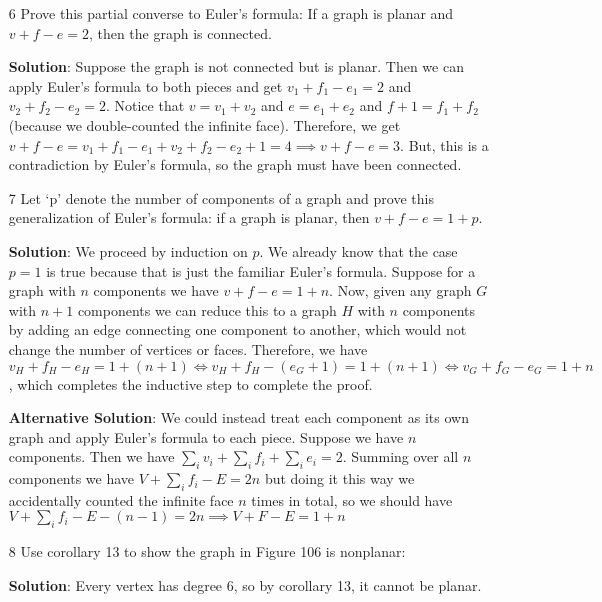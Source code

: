 \documentclass{article}
\begin{document}
\begin{enumerate}
	\item[6] Prove this partial converse to Euler's formula: If a graph is planar and $v + f - e = 2$, then the graph is connected.
	
	\textbf{Solution}: Suppose the graph is not connected but is planar. Then we can apply Euler's formula to both pieces and get $v_1 + f_1 - e_1 = 2$ and $v_2 + f_2 - e_2 = 2$. Notice that $v = v_1 + v_2$ and $e = e_1 + e_2$ and $f + 1= f_1 + f_2$ (because we double-counted the infinite face). Therefore, we get $v + f - e = v_1 + f_1 - e_1 + v_2 + f_2 - e_2 + 1 = 4 \implies v + f - e = 3$. But, this is a contradiction by Euler's formula, so the graph must have been connected.
	
	\item[7] Let `p' denote the number of components of a graph and prove this generalization of Euler's formula: if a graph is planar, then $v + f - e = 1 + p$.
	
	\textbf{Solution}: We proceed by induction on $p$. We already know that the case $p = 1$ is true because that is just the familiar Euler's formula. Suppose for a graph with $n$ components we have $v + f - e = 1 + n$. Now, given any graph $G$ with $n + 1$ components we can reduce this to a graph $H$ with $n$ components by adding an edge connecting one component to another, which would not change the number of vertices or faces. Therefore, we have $v_H + f_H - e_H = 1 + (n + 1) \iff v_H + f_H - (e_G + 1) = 1 + (n + 1) \iff v_G + f_G - e_G = 1 + n$, which completes the inductive step to complete the proof.
	
	\textbf{Alternative Solution}: We could instead treat each component as its own graph and apply Euler's formula to each piece. Suppose we have $n$ components. Then we have $\sum_{i}{v_i} + \sum_{i}{f_i} + \sum_{i}{e_i} = 2$. Summing over all $n$ components we have $V + \sum_{i}{f_i} - E = 2n$ but doing it this way we accidentally counted the infinite face $n$ times in total, so we should have $V + \sum_{i}{f_i} - E - (n - 1) = 2n \implies V + F - E = 1 + n$

	\item[8] Use corollary 13 to show the graph in Figure 106 is nonplanar:
	
	\textbf{Solution}: Every vertex has degree 6, so by corollary 13, it cannot be planar.
\end{enumerate}
\end{document}
